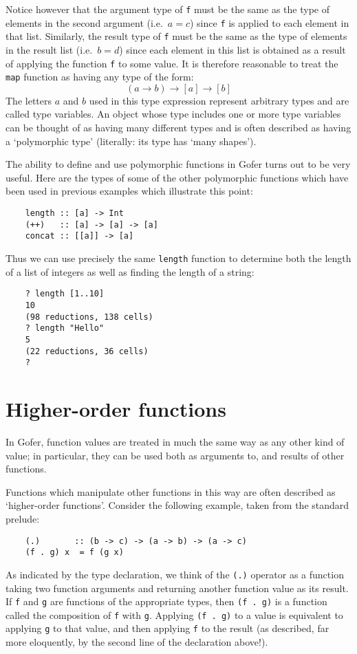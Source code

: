 Notice however that the argument type of \verb"f" must be the  same  as  the
type of elements in the second argument (i.e.\  $a=c$)  since  \verb"f"  is
applied to each element in that list.  Similarly, the  result  type  of
\verb"f" must be the same as the type of elements in the result list (i.e.\ $b
= d$) since each element in  this  list  is  obtained  as  a  result  of
applying the function \verb"f" to some value.  It is therefore reasonable to
treat the \verb"map" function as having any type of the form:
\[
                  (a \to b)  \to  [a]  \to  [b]
\]
The letters  $a$  and  $b$  used  in  this  type  expression  represent
arbitrary types and are called type variables.  An  object  whose  type
includes one or more type variables can be thought of  as  having  many
different types and is often described as having a  `polymorphic  type'
(literally: its type has `many shapes').

The ability to define and use polymorphic functions in Gofer turns  out
to be very useful.  Here are the types of some of the other polymorphic
functions which have been used in previous  examples  which  illustrate
this point:
\begin{verbatim}
    length :: [a] -> Int
    (++)   :: [a] -> [a] -> [a]
    concat :: [[a]] -> [a]
\end{verbatim}
Thus we can use precisely the same \verb"length" function to determine  both
the length of a list of integers as well as finding  the  length  of  a
string:
\begin{verbatim}
    ? length [1..10]
    10
    (98 reductions, 138 cells)
    ? length "Hello"
    5
    (22 reductions, 36 cells)
    ? 
\end{verbatim}

\section{Higher-order functions}
In Gofer, function values are treated in much the same way as any other
kind of value; in particular, they can be used both  as  arguments  to,
and results of other functions.

Functions which manipulate  other  functions  in  this  way  are  often
described as `higher-order functions'.  Consider the following example,
taken from the standard prelude:
\begin{verbatim}
    (.)       :: (b -> c) -> (a -> b) -> (a -> c)
    (f . g) x  = f (g x)
\end{verbatim}
As indicated by the type declaration, we think of the \verb"(.)" operator as a
function taking two function arguments and returning  another  function
value as its result.  If \verb"f" and  \verb"g"
are  functions  of  the  appropriate
types, then \verb"(f . g)" 
is a function called the composition of \verb"f"  with  \verb"g".
Applying \verb"(f . g)" to a value is equivalent to applying \verb"g"
to that  value,
and then applying \verb"f" to the result (as described, far  more  eloquently,
by the second line of the declaration above!).

